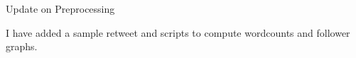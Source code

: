 Update on Preprocessing

I have added a sample retweet and scripts to compute wordcounts and follower graphs.